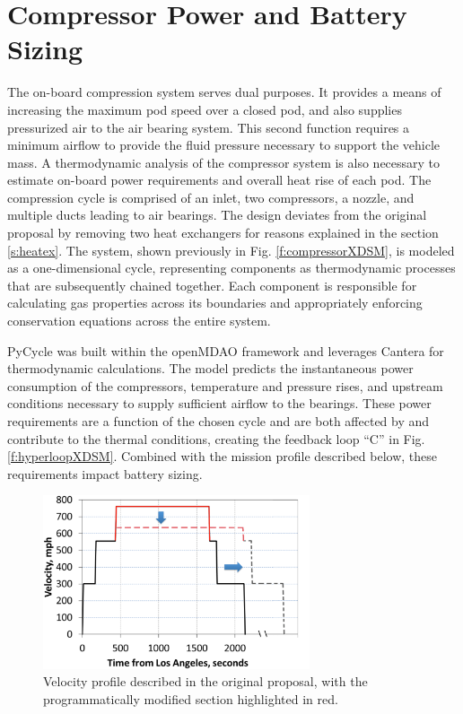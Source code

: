 \documentclass[heading.tex]{subfiles}
\begin{document}
\section{Compressor Power and Battery Sizing}
\label{sec:compressor-and-battery}

The on-board compression system serves dual purposes.
It provides a means of increasing the maximum pod speed over a closed pod, and also supplies pressurized air to the air bearing system.
This second function requires a minimum airflow to provide the fluid pressure necessary to support the vehicle mass.
A thermodynamic analysis of the compressor system is also necessary to
estimate on-board power requirements and overall heat rise of each pod.
The compression cycle is comprised of an inlet, two compressors, a nozzle, and multiple ducts leading to air bearings.
The design deviates from the original proposal by removing two heat exchangers for reasons explained in the section \ref{s:heatex}.
The system, shown previously in Fig. \ref{f:compressorXDSM}, is modeled as a one-dimensional cycle,
representing components as thermodynamic processes that are subsequently chained together.
Each component is responsible for calculating gas properties across its boundaries
and appropriately enforcing conservation equations across the entire system.

PyCycle was built within the openMDAO framework and leverages Cantera \cite{goodwin2009cantera} for thermodynamic calculations.
The model predicts the instantaneous power consumption of the compressors, temperature and pressure rises,
and upstream conditions necessary to supply sufficient airflow to the bearings.
These power requirements are a function of the chosen cycle and are both affected by
and contribute to the thermal conditions, creating the feedback loop “C” in Fig. \ref{f:hyperloopXDSM}.
Combined with the mission profile described below, these requirements impact battery sizing.

\begin{figure}[hbtp]
\centering
\includegraphics[width=0.7\textwidth]{images/velocity_profile3.png}
\caption{Velocity profile described in the original proposal, with the programmatically modified section highlighted in red.}
\label{f:velocity}
\end{figure}
\end{document}
